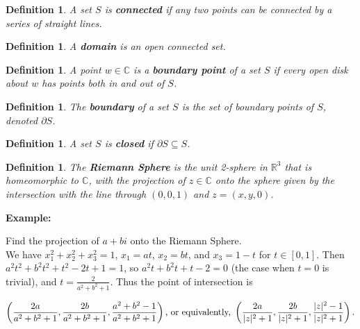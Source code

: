\documentclass{article}
\theoremstyle{colontheorem}
\newtheorem{definition}[theorem]{Definition}
\newenvironment{Def}
{
	\begin{mdframed}[backgroundcolor=DefGreen!10]
	\begin{definition}
}
{
	\end{definition}
	\end{mdframed}
	
	\vspace{.15in}
}
\newenvironment{Example}
{
	\begin{mdframed}
	\textbf{Example:}%
}
{
	\end{mdframed}
	
	\vspace{.15in}
}
\begin{document}
\begin{Def}
	
	A set $S$ is \textbf{connected} if any two points can be connected by a series of straight lines.
	
\end{Def}



\begin{Def}
	
	A \textbf{domain} is an open connected set.
	
\end{Def}



\begin{Def}
	
	A point $w \in \mathbb{C}$ is a \textbf{boundary point} of a set $S$ if every open disk about $w$ has points both in and out of $S$.
	
\end{Def}



\begin{Def}
	
	The \textbf{boundary} of a set $S$ is the set of boundary points of $S$, denoted $\partial S$.
	
\end{Def}



\begin{Def}
	
	A set $S$ is \textbf{closed} if $\partial S \subseteq S$.
	
\end{Def}



\begin{Def}
	
	The \textbf{Riemann Sphere} is the unit 2-sphere in $\mathbb{R}^3$ that is homeomorphic to $\mathbb{C}$, with the projection of $z \in \mathbb{C}$ onto the sphere given by the intersection with the line through $(0, 0, 1)$ and $z = (x, y, 0)$.
	
\end{Def}



\begin{Example}
	Find the projection of $a+bi$ onto the Riemann Sphere.\\
	
	We have $x_1^2 + x_2^2 + x_3^2 = 1$, $x_1 = at$, $x_2 = bt$, and $x_3 = 1-t$ for $t \in [0, 1]$. Then $a^2 t^2 + b^2 t^2 + t^2 - 2t + 1 = 1$, so $a^2 t + b^2 t + t - 2 = 0$ (the case when $t = 0$ is trivial), and $t = \frac{2}{a^2 + b^2 + 1}$. Thus the point of intersection is
	
	$$
		\left( \frac{2a}{a^2 + b^2 + 1}, \frac{2b}{a^2 + b^2 + 1}, \frac{a^2 + b^2 - 1}{a^2 + b^2 + 1} \right) \textnormal{, or equivalently, } \left( \frac{2a}{|z|^2 + 1}, \frac{2b}{|z|^2 + 1}, \frac{|z|^2 - 1}{|z|^2 + 1} \right) \textnormal{.}
	$$
	
\end{Example}
\end{document}
